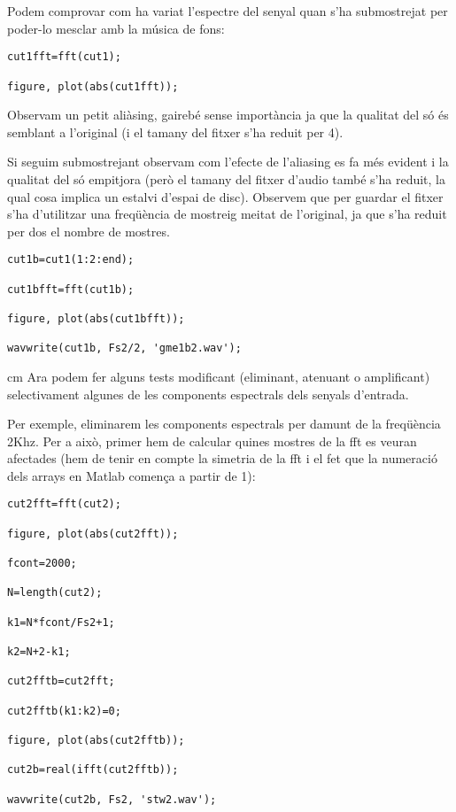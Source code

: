 \documentclass{article}
\begin{document}
Podem comprovar com ha variat l'espectre del senyal quan s'ha submostrejat per poder-lo mesclar 
amb la música de fons:

\begin{verbatim}
cut1fft=fft(cut1);

figure, plot(abs(cut1fft));
\end{verbatim}
Observam un petit aliàsing, gairebé sense importància ja que la qualitat del só és semblant a l'original
(i el tamany del fitxer s'ha reduit per 4).

Si seguim submostrejant observam com l'efecte de l'aliasing es fa més evident i la qualitat del só empitjora
(però el tamany del fitxer d'audio també s'ha reduit, la qual cosa implica un estalvi d'espai de disc).
Observem que per guardar el fitxer s'ha d'utilitzar una freqüència de mostreig meitat de l'original, 
ja que s'ha reduit per dos el nombre de mostres.

\begin{verbatim}
cut1b=cut1(1:2:end);

cut1bfft=fft(cut1b);

figure, plot(abs(cut1bfft));

wavwrite(cut1b, Fs2/2, 'gme1b2.wav');
\end{verbatim}



 cm
Ara podem fer alguns tests modificant (eliminant, atenuant o amplificant) selectivament algunes de les components
espectrals dels senyals d'entrada.

Per exemple, eliminarem les components espectrals per damunt de la freqüència 2Khz.
Per a això, primer hem de calcular quines mostres de la fft es veuran afectades (hem de tenir en compte la simetria de la fft
i el fet que la numeració dels arrays en Matlab comença a partir de 1):

\begin{verbatim}
cut2fft=fft(cut2);

figure, plot(abs(cut2fft));

fcont=2000;

N=length(cut2);

k1=N*fcont/Fs2+1;

k2=N+2-k1;

cut2fftb=cut2fft;

cut2fftb(k1:k2)=0;

figure, plot(abs(cut2fftb));

cut2b=real(ifft(cut2fftb));

wavwrite(cut2b, Fs2, 'stw2.wav');

\end{verbatim}
\end{document}
